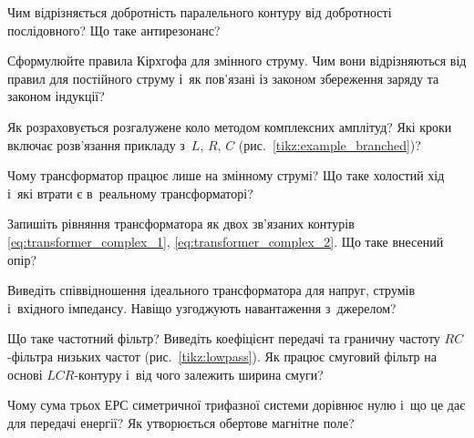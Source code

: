 \begin{Questions}
\begin{quizlist}
	\item Чим відрізняється добротність паралельного контуру від добротності послідовного? Що таке антирезонанс?
	\item Сформулюйте правила Кірхгофа для змінного струму. Чим вони відрізняються від правил для постійного струму і~як пов'язані із законом збереження заряду та законом індукції?
	\item Як розраховується розгалужене коло методом комплексних амплітуд? Які кроки включає розв'язання прикладу з~$L$, $R$, $C$ (рис.~\ref{tikz:example_branched})?
	\item Чому трансформатор працює лише на змінному струмі? Що таке холостий хід і~які втрати є в~реальному трансформаторі?
	\item Запишіть рівняння трансформатора як двох зв'язаних контурів \eqref{eq:transformer_complex_1}, \eqref{eq:transformer_complex_2}. Що таке внесений опір?
	\item Виведіть співвідношення ідеального трансформатора для напруг, струмів і~вхідного імпедансу. Навіщо узгоджують навантаження з~джерелом?
	\item Що таке частотний фільтр? Виведіть коефіцієнт передачі та граничну частоту $RC$-фільтра низьких частот (рис.~\ref{tikz:lowpass}). Як працює смуговий фільтр на основі $LCR$-контуру і~від чого залежить ширина смуги?
	\item Чому сума трьох ЕРС симетричної трифазної системи дорівнює нулю і~що це дає для передачі енергії? Як утворюється обертове магнітне поле?
\end{quizlist}
\end{Questions}

